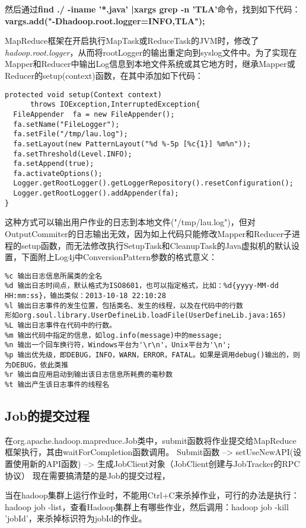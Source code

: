 然后通过\textbf{find ./ -iname '*.java' |xargs grep -n 'TLA'}命令，找到如下代码：\textbf{vargs.add("-Dhadoop.root.logger=INFO,TLA");}
\par MapReduce框架在开启执行MapTask或ReduceTask的JVM时，修改了\textsl{hadoop.root.logger}，从而将rootLogger的输出重定向到syslog文件中。为了实现在Mapper和Reducer中输出Log信息到本地文件系统或其它地方时，继承Mapper或Reducer的setup(context)函数，在其中添加如下代码：
\begin{verbatim}
protected void setup(Context context) 
      throws IOException,InterruptedException{
  FileAppender  fa = new FileAppender();
  fa.setName("FileLogger");
  fa.setFile("/tmp/lau.log");
  fa.setLayout(new PatternLayout("%d %-5p [%c{1}] %m%n"));
  fa.setThreshold(Level.INFO);
  fa.setAppend(true);
  fa.activateOptions();
  Logger.getRootLogger().getLoggerRepository().resetConfiguration();
  Logger.getRootLogger().addAppender(fa);
}
\end{verbatim}
\par 这种方式可以输出用户作业的日志到本地文件("/tmp/lau.log")，但对OutputCommiter的日志输出无效，因为如上代码只能修改Mapper和Reducer子进程的setup函数，而无法修改执行SetupTask和CleanupTask的Java虚拟机的默认设置，下面附上Log4j中ConversionPattern参数的格式意义：
\begin{verbatim}
%c 输出日志信息所属类的全名
%d 输出日志时间点，默认格式为ISO8601，也可以指定格式，比如：%d{yyyy-MM-dd HH:mm:ss}，输出类似：2013-10-18 22:10:28
%l 输出日志事件的发生位置，包括类名、发生的线程，以及在代码中的行数
形如org.soul.library.UserDefineLib.loadFile(UserDefineLib.java:165)
%L 输出日志事件在代码中的行数。
%m 输出代码中指定的信息，如log.info(message)中的message;
%n 输出一个回车换行符，Windows平台为'\r\n'，Unix平台为'\n';
%p 输出优先级，即DEBUG，INFO，WARN，ERROR，FATAL。如果是调用debug()输出的，则为DEBUG，依此类推
%r 输出自应用启动到输出该日志信息所耗费的毫秒数
%t 输出产生该日志事件的线程名
\end{verbatim}
\subsection{Job的提交过程}
在org.apache.hadoop.mapreduce.Job类中，submit函数将作业提交给MapReduce框架执行，其由waitForCompletion函数调用。
Submit函数 --> setUseNewAPI(设置使用新的API函数) --> 生成JobClient对象（JobClient创建与JobTracker的RPC协议）
现在需要搞清楚的是Job的提交过程，
\par 当在hadoop集群上运行作业时，不能用Ctrl+C来杀掉作业，可行的办法是执行：hadoop job -list，查看Hadoop集群上有哪些作业，然后调用：hadoop job -kill 'jobId'，来杀掉标识符为jobId的作业。
